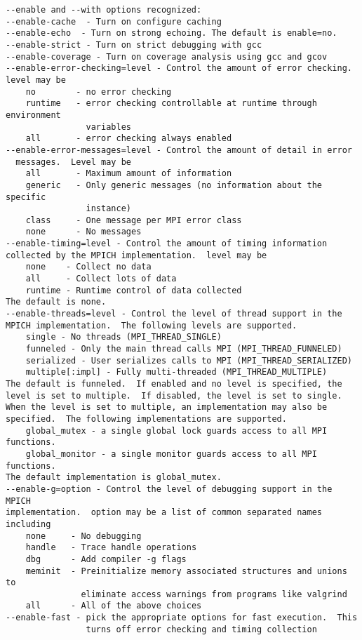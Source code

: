 \documentclass[dvipdfm,11pt]{article}
\begin{document}
\begin{small}
\begin{verbatim}
--enable and --with options recognized:
--enable-cache  - Turn on configure caching
--enable-echo  - Turn on strong echoing. The default is enable=no. 
--enable-strict - Turn on strict debugging with gcc
--enable-coverage - Turn on coverage analysis using gcc and gcov
--enable-error-checking=level - Control the amount of error checking.  
level may be 
    no        - no error checking
    runtime   - error checking controllable at runtime through environment 
                variables
    all       - error checking always enabled
--enable-error-messages=level - Control the amount of detail in error 
  messages.  Level may be
    all       - Maximum amount of information
    generic   - Only generic messages (no information about the specific
                instance)
    class     - One message per MPI error class
    none      - No messages
--enable-timing=level - Control the amount of timing information 
collected by the MPICH implementation.  level may be
    none    - Collect no data
    all     - Collect lots of data
    runtime - Runtime control of data collected
The default is none.
--enable-threads=level - Control the level of thread support in the 
MPICH implementation.  The following levels are supported.
    single - No threads (MPI_THREAD_SINGLE)
    funneled - Only the main thread calls MPI (MPI_THREAD_FUNNELED)
    serialized - User serializes calls to MPI (MPI_THREAD_SERIALIZED)
    multiple[:impl] - Fully multi-threaded (MPI_THREAD_MULTIPLE)
The default is funneled.  If enabled and no level is specified, the
level is set to multiple.  If disabled, the level is set to single.
When the level is set to multiple, an implementation may also be
specified.  The following implementations are supported.
    global_mutex - a single global lock guards access to all MPI functions.
    global_monitor - a single monitor guards access to all MPI functions.
The default implementation is global_mutex.
--enable-g=option - Control the level of debugging support in the MPICH
implementation.  option may be a list of common separated names including
    none     - No debugging
    handle   - Trace handle operations
    dbg      - Add compiler -g flags
    meminit  - Preinitialize memory associated structures and unions to
               eliminate access warnings from programs like valgrind
    all      - All of the above choices
--enable-fast - pick the appropriate options for fast execution.  This
                turns off error checking and timing collection

\end{verbatim}
\end{small}
\end{document}
